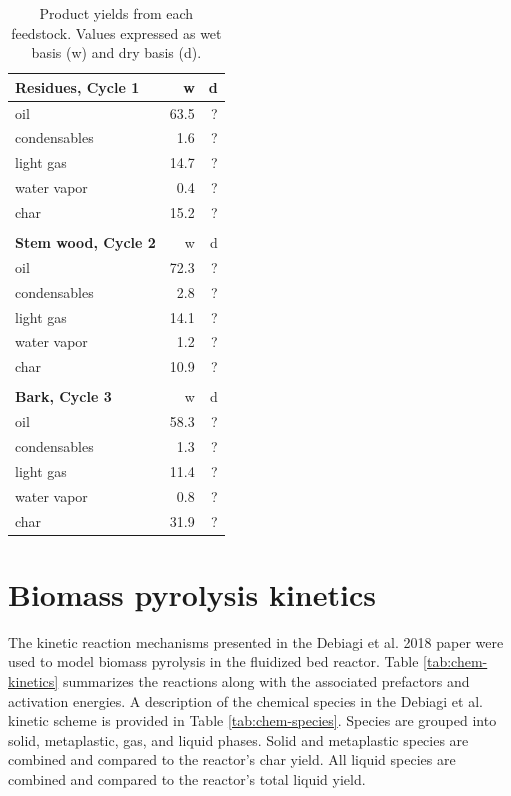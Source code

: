 \documentclass[12pt,titlepage]{article}
\begin{document}
\begin{longtable}{lrr}
    \caption{Product yields from each feedstock. Values expressed as wet basis (w) and dry basis (d).}
    \label{tab:yields} \\

    \textbf{Residues, Cycle 1} & w & d \\
    \midrule
    oil             & 63.5 & ? \\
    condensables    & 1.6  & ? \\
    light gas       & 14.7 & ? \\
    water vapor     & 0.4  & ? \\
    char            & 15.2 & ? \\
    \\

    \textbf{Stem wood, Cycle 2} & w & d \\
    \midrule
    oil             & 72.3 & ? \\
    condensables    & 2.8  & ? \\
    light gas       & 14.1 & ? \\
    water vapor     & 1.2  & ? \\
    char            & 10.9 & ? \\
    \\

    \textbf{Bark, Cycle 3} & w & d \\
    \midrule
    oil             & 58.3 & ? \\
    condensables    & 1.3  & ? \\
    light gas       & 11.4 & ? \\
    water vapor     & 0.8  & ? \\
    char            & 31.9 & ? \\
\end{longtable}

\section{Biomass pyrolysis kinetics}

The kinetic reaction mechanisms presented in the Debiagi et al. 2018 paper \cite{Debiagi-2018} were used to model biomass pyrolysis in the fluidized bed reactor. Table \ref{tab:chem-kinetics} summarizes the reactions along with the associated prefactors and activation energies. A description of the chemical species in the Debiagi et al. kinetic scheme is provided in Table \ref{tab:chem-species}. Species are grouped into solid, metaplastic, gas, and liquid phases. Solid and metaplastic species are combined and compared to the reactor's char yield. All liquid species are combined and compared to the reactor's total liquid yield.
\end{document}
